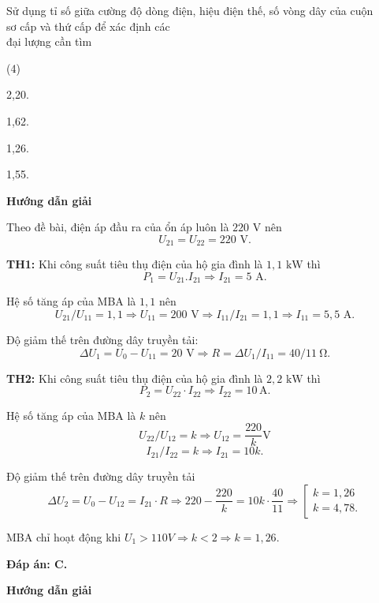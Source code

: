 \begin{dang}{Sử dụng tỉ số giữa cường độ dòng điện, hiệu điện thế, số vòng dây của cuộn\\ sơ cấp và thứ cấp để xác định các\\ đại lượng cần tìm}
{		\begin{mcq}(4)
			\item 2,20.
			\item 1,62.
			\item 1,26.
			\item 1,55.
		\end{mcq}
	}
	{	\begin{center}
			\textbf{Hướng dẫn giải}
		\end{center}
		
		Theo đề bài, điện áp đầu ra của ổn áp luôn là $220\textrm{ V}$ nên	
		$$U_{21}=U_{22}=220\textrm{ V}.$$
		
		\textbf{TH1:} Khi công suất tiêu thụ điện của hộ gia đình là $1,1\textrm{ kW}$ thì	 
		$$P_1=U_{21}.I_{21}\Rightarrow I_{21}=5\textrm{ A}.$$
		
		Hệ số tăng áp của MBA là $1,1$ nên
		$$U_{21}/U_{11} =1,1\Rightarrow U_{11}=200\textrm{ V}\Rightarrow I_{11}/I_{21} =1,1 \Rightarrow I_{11}=5,5\textrm{ A}.$$
		
		Độ giảm thế trên đường dây truyền tải:
		$$\Delta U_1=U_0-U_{11}=20\textrm{ V}\Rightarrow R=\Delta U_1/I_{11} =40/11  \SI{}{\ohm}.$$
		
		\textbf{TH2:} Khi công suất tiêu thụ điện của hộ gia đình là $2,2\textrm{ kW}$ thì
		$$P_2=U_{22}\cdot I_{22}\Rightarrow I_{22}=10 \,\text{A}.$$
		
		Hệ số tăng áp của MBA là $k$ nên
		$$U_{22}/U_{12} = k\Rightarrow U_{12}=\frac{220}{k} \textrm{V}$$  $$I_{21}/I_{22} = k \Rightarrow I_{21}=10k.$$
		
		Độ giảm thế trên đường dây truyền tải
		$$\Delta U_2=U_0-U_{12}=I_{21}\cdot R\Rightarrow 220-\frac{220}{k}=10 k \cdot \frac{40}{11}\Rightarrow \left[\begin{array}{l}k=1,26\\ k=4,78.\end{array}\right.$$
		
		MBA chỉ hoạt động khi  $U_1>110 V \Rightarrow k<2 \Rightarrow k=1,26$.
		
		\textbf{Đáp án: C.}
	}
	{	\begin{center}
			\textbf{Hướng dẫn giải}
		\end{center}
		
}
\end{dang}
